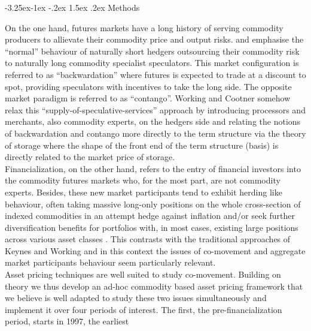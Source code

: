 \documentclass[11pt, letterpaper, doublespacing]{article}
\makeatletter
\renewcommand{\subsection}{\@startsection{subsection}{2}{\z@}%
  {-3.25ex\@plus -1ex \@minus -.2ex}%
  {1.5ex \@plus .2ex}%
  {\normalfont\large\slshape}}
\makeatother
\begin{document}
\subsection{Methods}\label{methods}

On the one hand, futures markets have a long history of serving
commodity producers to allievate their commodity price and output risks.
\citet{keynes_treatise_1930} and \citet{hicks_value_1939} emphasise the
``normal'' behaviour of naturally short hedgers outsourcing their
commodity risk to naturally long commodity specialist speculators. This
market configuration is referred to as ``backwardation'' where futures
is expected to trade at a discount to spot, providing speculators with
incentives to take the long side. The opposite market paradigm is
referred to as ``contango''. Working
\citep{working_theory_1948, working_hedging_1953} and Cootner
\citep{cootner_returns_1960, CootnerSpeculationhedging1967} somehow
relax this ``supply-of-speculative-services''
\citep{Tilllongtermperspectivecommodity2007} approach by introducing
processors and merchants, also commodity experts, on the hedgers side
and relating the notions of backwardation and contango more directly to
the term structure via the theory of storage where the shape of the
front end of the term structure (basis) is directly related to the
market price of storage.\\
Financialization, on the other hand, refers to the entry of financial
investors into the commodity futures markets who, for the most part, are
not commodity experts. Besides, these new market participants tend to
exhibit herding like behaviour, often taking massive long-only positions
on the whole cross-section of indexed commodities in an attempt hedge
against inflation and/or seek further diversification benefits for
portfolios with, in most cases, existing large positions across various
asset classes
\citep{brunetti_speculators_2016, boyd_prevalence_2016, cheng_convective_2014, juvenal_speculation_2015, singleton_investor_2013, tang_index_2012}.
This contrasts with the traditional approaches of Keynes and Working and
in this context the issues of co-movement and aggregate market
participants behaviour seem particularly relevant.\\
Asset pricing techniques are well suited to study co-movement. Building
on theory we thus develop an ad-hoc commodity based asset pricing
framework that we believe is well adapted to study these two issues
simultaneously and implement it over four periods of interest. The
first, the pre-financialization period, starts in 1997, the earliest
\end{document}
